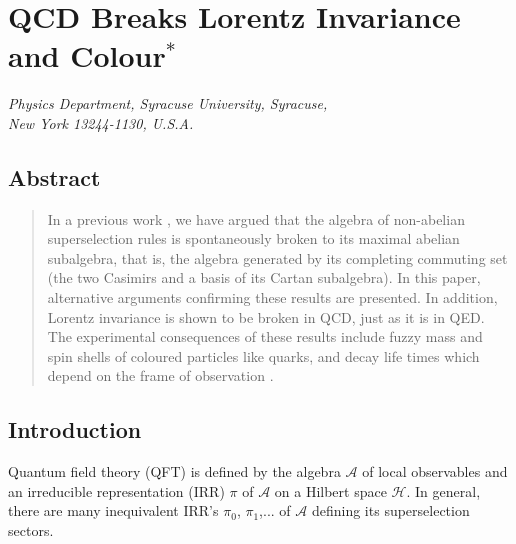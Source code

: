\chapter[QCD Breaks Lorentz Invariance and Colour]{QCD Breaks Lorentz Invariance and Colour$^{*}$}\label{chap1}



\begin{center}
\textit{Physics Department, Syracuse University, Syracuse,}\\ 
\textit{New York 13244-1130, U.S.A.}
\end{center}


\section*{Abstract}

\begin{quote}
In a previous work \cite{key1}, we have argued that the algebra of non-abelian superselection rules is spontaneously broken to its maximal abelian subalgebra, that is, the algebra generated by its completing commuting set (the two Casimirs and a basis of its Cartan subalgebra). In this paper, alternative arguments confirming these results are presented. In addition, Lorentz invariance is shown to be broken in QCD, just as it is in QED. The experimental consequences of these results include fuzzy mass and spin shells of coloured particles like quarks, and decay life times which depend on the frame of observation \cite{key2,key3,key4}.
\end{quote}

\vspace{-.6cm}

\section{Introduction}\label{chap1-sec1}

Quantum field theory (QFT) is defined by the algebra $\mathcal{A}$ of local observables and an irreducible representation (IRR) $\pi$ of $\mathcal{A}$ on a Hilbert space $\mathcal{H}$. In general, there are many inequivalent IRR's $\pi_{0}$, $\pi_{1}$,... of $\mathcal{A}$ defining its superselection sectors.

